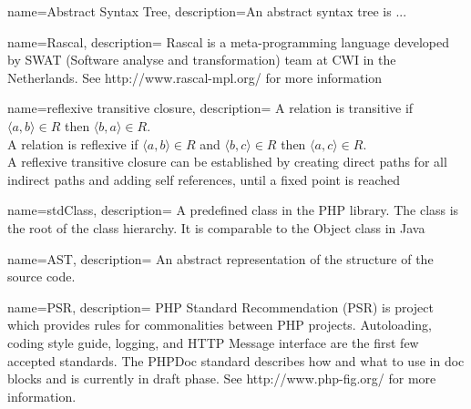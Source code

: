 \documentclass[main.tex]{subfiles}
\begin{document}
    {
        name=Abstract Syntax Tree,
        description={An abstract syntax tree is ...}
    }
    
    {
        name=Rascal,
        description={
            Rascal is a meta-programming language developed by SWAT (Software analyse and transformation) team at CWI in the Netherlands}.
            See http://www.rascal-mpl.org/ for more information
    }
    
    {
        name=reflexive transitive closure,
        description={
            A relation is transitive if $\langle a,b \rangle \in R$ then $\langle b,a \rangle \in R$. \\
            A relation is reflexive if $\langle a,b \rangle \in R$ and $\langle b,c \rangle \in R$ then $\langle a,c \rangle \in R$. \\
            A reflexive transitive closure can be established by creating direct paths for all indirect paths and adding self references, until a fixed point is reached}
    }
    
    {
        name=stdClass,
        description={
            A predefined class in the PHP library. The class is the root of the class hierarchy. 
            It is comparable to the Object class in Java}
    }
    
    {
        name=AST,
        description={
            An abstract representation of the structure of the source code.
        }
    }
    
    {
        name=PSR,
        description={
            PHP Standard Recommendation (PSR) is project which provides rules for commonalities between PHP projects.
            Autoloading, coding style guide, logging, and HTTP Message interface are the first few accepted standards.
            The PHPDoc standard describes how and what to use in doc blocks and is currently in draft phase.  
            See http://www.php-fig.org/ for more information.
        }
    }
\end{document}
